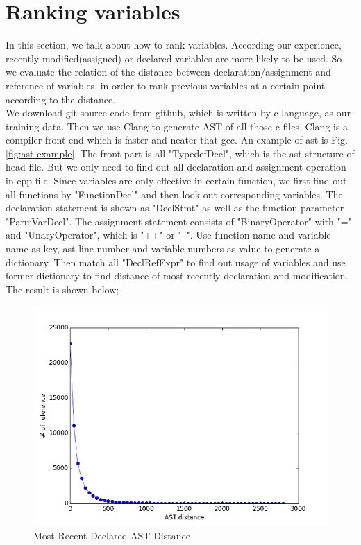 \documentclass[prodmode,acmtecs]{acmsmall} %
\begin{document}
\section{Ranking variables}
In this section, we talk about how to rank variables. According our experience, recently modified(assigned) or declared variables are more likely to be used. So we evaluate the relation of the distance between declaration/assignment and reference of variables, in order to rank previous variables at a certain point according to the distance. \\
We download git source code from github, which is written by c language, as our training data. Then we use Clang to generate AST of all those c files. Clang is a compiler front-end which is faster and neater that gcc. An example of ast is Fig. \ref{fig:ast example}. The front part is all "TypedefDecl", which is the ast structure of head file. But we only need to find out all declaration and assignment operation in cpp file. Since variables are only effective in certain function, we first find out all functions by "FunctionDecl" and then look out corresponding variables. The declaration statement is shown as "DeclStmt" as well as the function parameter "ParmVarDecl". The assignment statement consists of "BinaryOperator" with "=" and "UnaryOperator", which is "++" or "--". Use function name and variable name as key, ast line number and variable numbers as value to generate a dictionary. Then match all "DeclRefExpr" to find out usage of variables and use former dictionary to find distance of most recently declaration and modification. The result is shown below;

\begin{figure}
\centerline{\includegraphics[width=1.0\textwidth]{declare_ast_distance}}
\caption{Most Recent Declared AST Distance}
\label{fig:declare ast distance}
\end{figure}
                                                           
\end{document}
